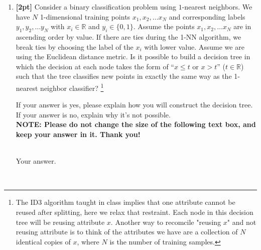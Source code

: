 \documentclass[12pt]{article}
\renewcommand{\circle}{\tikz\draw[black] (0,0) circle (1ex);}
\begin{document}
\begin{enumerate}
    
    \item \textbf{[2pt]} Consider a binary classification problem using $1$-nearest neighbors. We have $N$ 1-dimensional training points $x_1, x_2, \ldots x_N$ and corresponding labels $y_1, y_2, \ldots y_N$ with $x_i \in \mathbb{R}$ and $y_i \in \{0, 1\}$. Assume the points $x_1, x_2, \ldots x_N$ are in ascending order by value. If there are ties during the 1-NN algorithm, we break ties by choosing the label of the $x_i$ with lower value. Assume we are using the Euclidean distance metric. Is it possible to build a decision tree in which the decision at each node takes the form of “$x \leq t$ or $x > t$” ($t \in \mathbb{R}$) such that the tree classifies new points in exactly the same way as the 1-nearest neighbor classifier? \footnote{The ID3 algorithm taught in class implies that one attribute cannot be reused after splitting, here we relax that restraint. Each node in this decision tree will be reusing attribute $x$. Another way to recomcile "reusing $x$" and not reusing attribute is to think of the attributes we have are a collection of $N$ identical copies of  $x$, where $N$ is the number of training samples.}
    
     If your answer is yes, please explain how you will construct the decision tree. If your answer is no, explain why it’s not possible.  \\
   
    \textbf{NOTE: Please do not change the size of the following text box, and keep your answer in it. Thank you!} \\ \\
    \begin{tcolorbox}[fit,height=4cm, width=15cm, blank, borderline={1pt}{-2pt},nobeforeafter]
    \large
    Your answer.

    \end{tcolorbox} \\
\end{enumerate}
\clearpage
\end{document}
